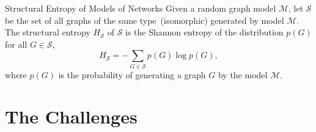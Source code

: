 \documentclass[t,aspectratio=169,usepdftitle=false]{beamer}
\begin{document}
  \begin{frame}{Structural Entropy of Models of Networks}
    Given a random graph model $\mathcal{M}$, let $\mathcal{S}$ be the set of all graphs of the same type~(isomorphic)
    generated by model $\mathcal{M}$. 
    The structural entropy $H_{\mathcal{S}}$ of $\mathcal{S}$ is the Shannon entropy of the distribution $p(G)$ for all 
    $G \in \mathcal{S}$, 
    \begin{equation}
      H_{\mathcal{S}} = - \sum_{G \in \mathcal{S}} p(G) \log p(G),
    \end{equation}
    where $p(G)$ is the probability of generating a graph $G$ by the model $\mathcal{M}$. \\
  \end{frame}


\section{The Challenges}
\end{document}
